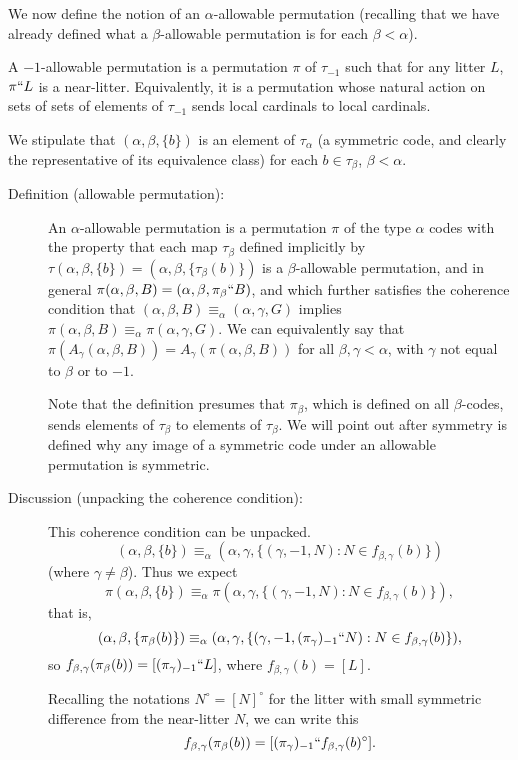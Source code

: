 We now define the notion of an $\alpha$-allowable permutation (recalling that we have already defined what a $\beta$-allowable permutation is for each $\beta<\alpha$).

A $-1$-allowable permutation is a permutation $\pi$ of $\tau_{-1}$ such that for any litter $L$, $\pi``L$ is a near-litter.  Equivalently, it is a permutation whose natural action on sets of sets of elements of $\tau_{-1}$ sends local cardinals to local cardinals.

We stipulate that $(\alpha,\beta,\{b\})$ is an element of $\tau_\alpha$ (a symmetric code, and clearly the representative of its equivalence class) for each $b \in \tau_\beta$, $\beta<\alpha$.

\begin{description}
\item[Definition (allowable permutation):]   An $\alpha$-allowable permutation is a permutation $\pi$ of the type $\alpha$ codes with the property that each map $\tau_\beta$
defined implicitly by $\tau(\alpha,\beta,\{b\}) = (\alpha,\beta,\{\tau_\beta(b)\})$ is a $\beta$-allowable permutation, and in general $\pi(\alpha,\beta,B) = (\alpha,\beta,\pi_\beta``B)$,  and which further satisfies the coherence condition that $(\alpha,\beta,B) \equiv_\alpha (\alpha,\gamma,G)$ implies
$\pi(\alpha,\beta,B) \equiv_\alpha \pi(\alpha,\gamma,G)$.  We can equivalently say that $\pi(A_\gamma(\alpha,\beta,B)) = A_\gamma(\pi(\alpha,\beta,B))$ for all $\beta,\gamma <\alpha$, with $\gamma$ not equal to $\beta$ or to $-1$.

Note that the definition presumes that $\pi_\beta$, which is defined on all $\beta$-codes, sends elements of $\tau_\beta$ to elements of $\tau_\beta$.  We will point out after symmetry is defined why any image of a symmetric code under an allowable permutation is symmetric.

\item[Discussion (unpacking the coherence condition):]  This coherence condition can be unpacked.  $$(\alpha,\beta,\{b\}) \equiv_{\alpha} (\alpha,\gamma,\{(\gamma,-1,N):N \in f_{\beta,\gamma}(b)\})$$ (where $\gamma\neq \beta$).  Thus we expect $$\pi(\alpha,\beta,\{b\}) \equiv_{\alpha} \pi(\alpha,\gamma,\{(\gamma,-1,N):N \in f_{\beta,\gamma}(b)\}),$$ that is, $$(\alpha,\beta,\{\pi_{\beta}(b)\}) \equiv_{\alpha} (\alpha,\gamma,\{(\gamma,-1,(\pi_{\gamma})_{-1}``N):N \in f_{\beta,\gamma}(b)\}),$$ so $f_{\beta,\gamma}(\pi_\beta(b)) = [(\pi_\gamma)_{-1}``L]$, where $f_{\beta,\gamma}(b)=[L]$.

Recalling the notations $N^\circ=[N]^\circ$ for the litter with small symmetric difference from the near-litter $N$, we can write this $$f_{\beta,\gamma}(\pi_\beta(b)) = [(\pi_\gamma)_{-1}``f_{\beta,\gamma}(b)^\circ].$$


\end{description}
